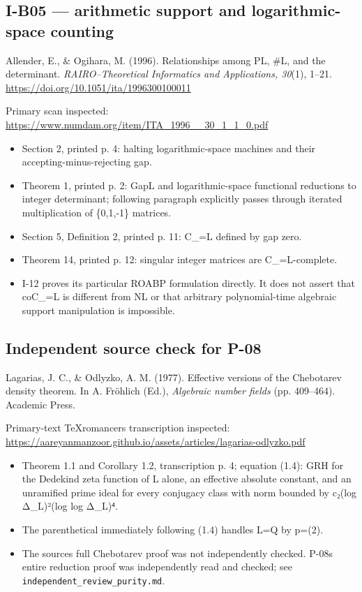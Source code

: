 \documentclass[11pt,a4paper]{article}
\providecommand{\tightlist}{\setlength{\itemsep}{0pt}\setlength{\parskip}{0pt}}
\theoremstyle{definition}\newtheorem{definition}{Definition}
\begin{document}
\subsection{I-B05 --- arithmetic support and logarithmic-space
counting}\label{i-b05--arithmetic-support-and-logarithmic-space-counting}

Allender, E., \& Ogihara, M. (1996). Relationships among PL, \#L, and
the determinant. \emph{RAIRO--Theoretical Informatics and Applications,
30}(1), 1--21. \url{https://doi.org/10.1051/ita/1996300100011}

Primary scan inspected:
\url{https://www.numdam.org/item/ITA_1996__30_1_1_0.pdf}

\begin{itemize}
\tightlist
\item
  Section 2, printed p. 4: halting logarithmic-space machines and their
  accepting-minus-rejecting gap.
\item
  Theorem 1, printed p. 2: GapL and logarithmic-space functional
  reductions to integer determinant; following paragraph explicitly
  passes through iterated multiplication of \{0,1,-1\} matrices.
\item
  Section 5, Definition 2, printed p. 11: C\_=L defined by gap zero.
\item
  Theorem 14, printed p. 12: singular integer matrices are
  C\_=L-complete.
\item
  I-12 proves its particular ROABP formulation directly. It does not
  assert that coC\_=L is different from NL or that arbitrary
  polynomial-time algebraic support manipulation is impossible.
\end{itemize}

\subsection{Independent source check for
P-08}\label{independent-source-check-for-p-08}

Lagarias, J. C., \& Odlyzko, A. M. (1977). Effective versions of the
Chebotarev density theorem. In A. Fröhlich (Ed.), \emph{Algebraic number
fields} (pp. 409--464). Academic Press.

Primary-text TeXromancers transcription inspected:
\url{https://aareyanmanzoor.github.io/assets/articles/lagarias-odlyzko.pdf}

\begin{itemize}
\tightlist
\item
  Theorem 1.1 and Corollary 1.2, transcription p. 4; equation (1.4): GRH
  for the Dedekind zeta function of L alone, an effective absolute
  constant, and an unramified prime ideal for every conjugacy class with
  norm bounded by c₂(log Δ\_L)²(log log Δ\_L)⁴.
\item
  The parenthetical immediately following (1.4) handles L=Q by p=(2).
\item
  The source\textquotesingle s full Chebotarev proof was not
  independently checked. P-08\textquotesingle s entire reduction proof
  was independently read and checked; see
  \nolinkurl{independent_review_purity.md}.
\end{itemize}
\end{document}
